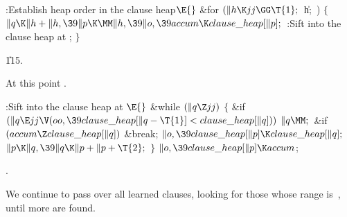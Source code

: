 \B{}:Establish heap order in the clause heap\X${}\E{}$\6
\&{for} ${}(\|h\K\\{jj}\GG\T{1};{}$ \|h; \,)\5
${}\{{}$\1\6
${}\|q\K\|h+\|h,\39\|p\K\MM\|h,\39\|o,\39\\{accum}\K\\{clause\_heap}[\|p];{}$\6
:Sift  into the clause heap at \X;\6
\4${}\}{}$\2\par
\U115.\fi

At this point .

\Y\B\4:Sift  into the clause heap at \X${}\E{}$\6
\&{while} ${}(\|q\Z\\{jj}){}$\5
${}\{{}$\1\6
\&{if} ${}(\|q\E\\{jj}\V(\\{oo},\39\\{clause\_heap}[\|q-\T{1}]<\\{clause%
\_heap}[\|q])){}$\1\5
${}\|q\MM;{}$\2\6
\&{if} ${}(\\{accum}\Z\\{clause\_heap}[\|q]){}$\1\5
\&{break};\2\6
${}\|o,\39\\{clause\_heap}[\|p]\K\\{clause\_heap}[\|q];{}$\6
${}\|p\K\|q,\39\|q\K\|p+\|p+\T{2};{}$\6
\4${}\}{}$\2\6
${}\|o,\39\\{clause\_heap}[\|p]\K\\{accum}{}$;\par
{}.\fi

We continue to pass over all learned clauses, looking for those
whose range is~, until  more are found.

